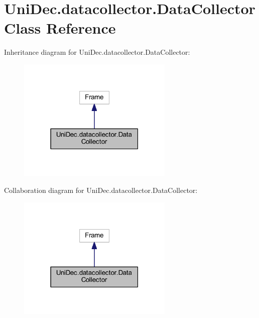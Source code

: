 \hypertarget{class_uni_dec_1_1datacollector_1_1_data_collector}{}\section{Uni\+Dec.\+datacollector.\+Data\+Collector Class Reference}
\label{class_uni_dec_1_1datacollector_1_1_data_collector}


Inheritance diagram for Uni\+Dec.\+datacollector.\+Data\+Collector\+:\nopagebreak
\begin{figure}[H]
\begin{center}
\leavevmode
\includegraphics[width=210pt]{class_uni_dec_1_1datacollector_1_1_data_collector__inherit__graph}
\end{center}
\end{figure}


Collaboration diagram for Uni\+Dec.\+datacollector.\+Data\+Collector\+:\nopagebreak
\begin{figure}[H]
\begin{center}
\leavevmode
\includegraphics[width=210pt]{class_uni_dec_1_1datacollector_1_1_data_collector__coll__graph}
\end{center}
\end{figure}
